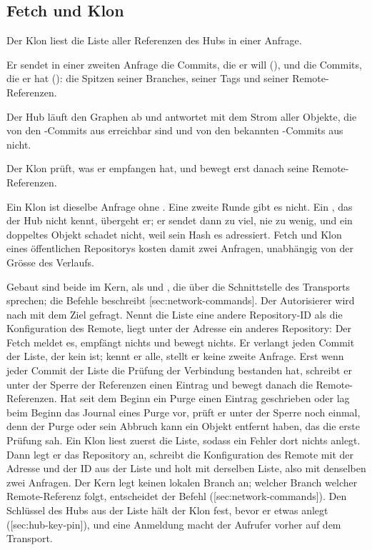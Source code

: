 \subsection{Fetch und Klon}

\startitemize[n]
\item Der Klon liest die Liste aller Referenzen des Hubs in einer Anfrage.
\item Er sendet in einer zweiten Anfrage die Commits, die er will (), und die Commits,
die er hat (): die Spitzen seiner Branches, seiner Tags und seiner Remote-Referenzen.
\item Der Hub läuft den Graphen ab und antwortet mit dem Strom aller Objekte, die von den
-Commits aus erreichbar sind und von den bekannten -Commits aus nicht.
\item Der Klon prüft, was er empfangen hat, und bewegt erst danach seine Remote-Referenzen.
\stopitemize

Ein Klon ist dieselbe Anfrage ohne .
Eine zweite Runde gibt es nicht.
Ein , das der Hub nicht kennt, übergeht er; er sendet dann zu viel, nie zu wenig, und
ein doppeltes Objekt schadet nicht, weil sein Hash es adressiert.
Fetch und Klon eines öffentlichen Repositorys kosten damit zwei Anfragen, unabhängig von der
Grösse des Verlaufs.

Gebaut sind beide im Kern, als  und ,
die über die Schnittstelle des Transports sprechen; die Befehle beschreibt
[sec:network-commands].
Der Autorisierer wird nach  mit dem Ziel  gefragt.
Nennt die Liste eine andere Repository-ID als die Konfiguration des Remote, liegt unter der
Adresse ein anderes Repository: Der Fetch meldet es, empfängt nichts und bewegt nichts.
Er verlangt jeden Commit der Liste, der kein  ist; kennt er alle, stellt er keine
zweite Anfrage.
Erst wenn jeder Commit der Liste die Prüfung der Verbindung bestanden hat, schreibt er unter der
Sperre der Referenzen einen Eintrag  und bewegt danach die Remote-Referenzen.
Hat seit dem Beginn ein Purge einen Eintrag geschrieben oder lag beim Beginn das Journal eines
Purge vor, prüft er unter der Sperre noch einmal, denn der Purge oder sein Abbruch kann ein
Objekt entfernt haben, das die erste Prüfung sah.
Ein Klon liest zuerst die Liste, sodass ein Fehler dort nichts anlegt.
Dann legt er das Repository an, schreibt die Konfiguration des Remote mit der Adresse und der
ID aus der Liste und holt mit derselben Liste, also mit denselben zwei Anfragen.
Der Kern legt keinen lokalen Branch an; welcher Branch welcher Remote-Referenz folgt, entscheidet
der Befehl  ([sec:network-commands]).
Den Schlüssel des Hubs aus der Liste hält der Klon fest, bevor er etwas anlegt
([sec:hub-key-pin]), und eine Anmeldung macht der Aufrufer vorher auf dem
Transport.

